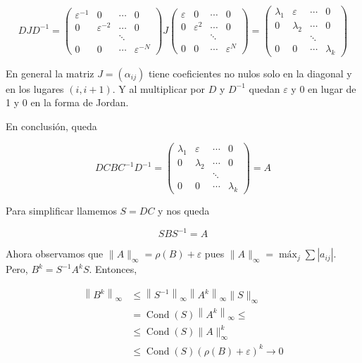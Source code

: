 \documentclass[10pt]{book}
\begin{document}
$$
D J D^{-1}=\left(\begin{array}{cccc}
\varepsilon^{-1} & 0 & \cdots & 0 \\
0 & \varepsilon^{-2} & \cdots & 0 \\
& & \ddots & \\
0 & 0 & \cdots & \varepsilon^{-N}
\end{array}\right) J\left(\begin{array}{cccc}
\varepsilon & 0 & \cdots & 0 \\
0 & \varepsilon^{2} & \cdots & 0 \\
& & \ddots & \\
0 & 0 & \cdots & \varepsilon^{N}
\end{array}\right)=\left(\begin{array}{cccc}
\lambda_{1} & \varepsilon & \cdots & 0 \\
0 & \lambda_{2} & \cdots & 0 \\
& & \ddots & \\
0 & 0 & \cdots & \lambda_{k}
\end{array}\right)
$$

En general la matriz $J=\left(\alpha_{i j}\right)$ tiene coeficientes no nulos solo en la diagonal y en los lugares $(i, i+1)$. Y al multiplicar por $D$ y $D^{-1}$ quedan $\varepsilon$ y 0 en lugar de 1 y 0 en la forma de Jordan.

En conclusión, queda

$$
D C B C^{-1} D^{-1}=\left(\begin{array}{cccc}
\lambda_{1} & \varepsilon & \cdots & 0 \\
0 & \lambda_{2} & \cdots & 0 \\
& & \ddots & \\
0 & 0 & \cdots & \lambda_{k}
\end{array}\right)=A
$$

Para simplificar llamemos $S=D C$ y nos queda

$$
S B S^{-1}=A
$$

Ahora observamos que $\|A\|_{\infty}=\rho(B)+\varepsilon$ pues $\|A\|_{\infty}=\operatorname{máx}_{j} \sum\left|a_{i j}\right|$.\\
Pero, $B^{k}=S^{-1} A^{k} S$. Entonces,

$$
\begin{aligned}
\left\|B^{k}\right\|_{\infty} & \leq\left\|S^{-1}\right\|_{\infty}\left\|A^{k}\right\|_{\infty}\|S\|_{\infty} \\
& =\operatorname{Cond}(S)\left\|A^{k}\right\|_{\infty} \leq \\
& \leq \operatorname{Cond}(S)\|A\|_{\infty}^{k} \\
& \leq \operatorname{Cond}(S)(\rho(B)+\varepsilon)^{k} \rightarrow 0
\end{aligned}
$$
\end{document}
